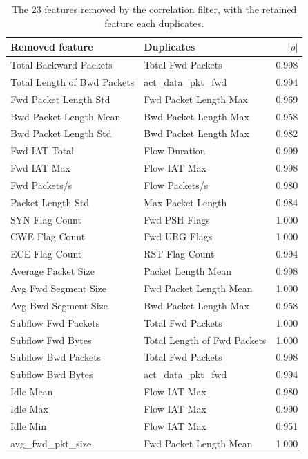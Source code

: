 \begin{table}[H]
  \centering
  \caption{The 23 features removed by the correlation filter, with the retained feature each duplicates.}
  \label{tab:dropped_corr}
  \renewcommand{\arraystretch}{1.25}
\begin{tabularx}{\textwidth}{lXr}
  \toprule
  \textbf{Removed feature} & \textbf{Duplicates} & $|\rho|$ \\
  \midrule
  Total Backward Packets      & Total Fwd Packets           & 0.998 \\
  Total Length of Bwd Packets & act\_data\_pkt\_fwd         & 0.994 \\
  Fwd Packet Length Std       & Fwd Packet Length Max       & 0.969 \\
  Bwd Packet Length Mean      & Bwd Packet Length Max       & 0.958 \\
  Bwd Packet Length Std       & Bwd Packet Length Max       & 0.982 \\
  Fwd IAT Total               & Flow Duration               & 0.999 \\
  Fwd IAT Max                 & Flow IAT Max                & 0.998 \\
  Fwd Packets/s               & Flow Packets/s              & 0.980 \\
  Packet Length Std           & Max Packet Length           & 0.984 \\
  SYN Flag Count              & Fwd PSH Flags               & 1.000 \\
  CWE Flag Count              & Fwd URG Flags               & 1.000 \\
  ECE Flag Count              & RST Flag Count              & 0.994 \\
  Average Packet Size         & Packet Length Mean          & 0.998 \\
  Avg Fwd Segment Size        & Fwd Packet Length Mean      & 1.000 \\
  Avg Bwd Segment Size        & Bwd Packet Length Max       & 0.958 \\
  Subflow Fwd Packets         & Total Fwd Packets           & 1.000 \\
  Subflow Fwd Bytes           & Total Length of Fwd Packets & 1.000 \\
  Subflow Bwd Packets         & Total Fwd Packets           & 0.998 \\
  Subflow Bwd Bytes           & act\_data\_pkt\_fwd         & 0.994 \\
  Idle Mean                   & Flow IAT Max                & 0.980 \\
  Idle Max                    & Flow IAT Max                & 0.990 \\
  Idle Min                    & Flow IAT Max                & 0.951 \\
  avg\_fwd\_pkt\_size         & Fwd Packet Length Mean      & 1.000 \\
  \bottomrule
\end{tabularx}
\end{table}
